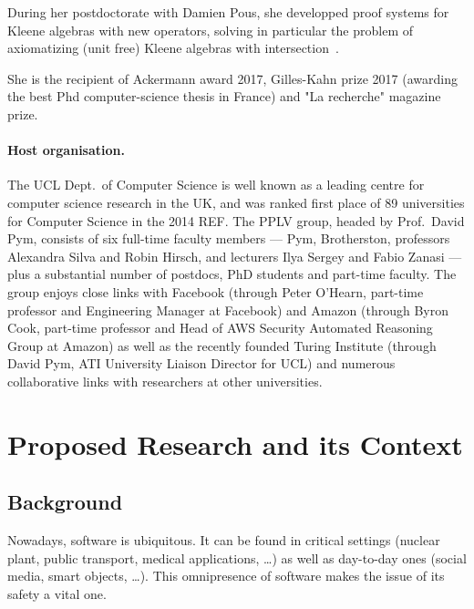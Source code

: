\documentclass[11pt,twocolumn]{article}
\begin{document}
During her postdoctorate with Damien Pous, she developped proof systems for Kleene algebras with new operators, solving in particular the problem of axiomatizing (unit free) Kleene algebras with intersection~.

She is the recipient of Ackermann award 2017, Gilles-Kahn prize 2017 (awarding the best Phd computer-science thesis  in France) and "La recherche" magazine prize. 

\paragraph{Host organisation.}
The UCL Dept.\ of Computer Science is well known as a leading centre for computer science research in the UK, and was ranked first place of 89 universities for Computer Science in the 2014 REF. The PPLV group, headed by Prof.\ David Pym, consists of six full-time faculty members --- Pym, Brotherston, professors Alexandra Silva and Robin Hirsch, and lecturers Ilya Sergey and Fabio Zanasi --- plus a substantial number of postdocs, PhD students and part-time faculty. The group enjoys close links with Facebook (through Peter O'Hearn, part-time professor and Engineering Manager at Facebook) and Amazon (through Byron Cook, part-time professor and Head of AWS Security Automated Reasoning Group at Amazon) as well as the recently founded Turing Institute (through David Pym, ATI University Liaison Director for UCL) and numerous collaborative links with researchers at other universities.


\begingroup
\footnotesize
{}
\endgroup

\section{Proposed Research and its Context}

\subsection{Background}
Nowadays, software is ubiquitous. It can be found in critical settings (nuclear plant,
public transport, medical applications, \dots) as well as day-to-day ones (social media, smart objects, \dots).  This omnipresence of software makes the issue of its safety a vital one.
\end{document}
